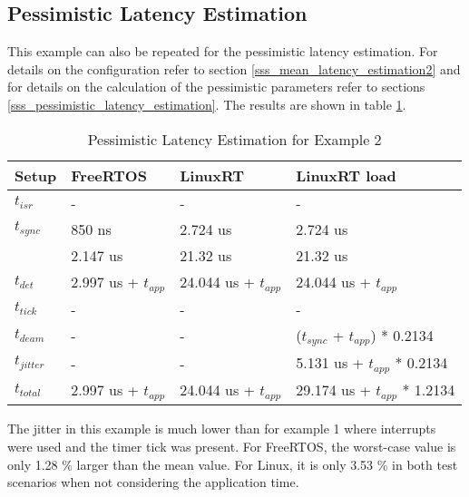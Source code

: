 \subsection{Pessimistic Latency Estimation}\label{sss_pessimistic_latency_estimation2}
This example can also be repeated for the pessimistic latency estimation.
For details on the configuration refer to section \ref{sss_mean_latency_estimation2} and for details on the calculation of the pessimistic parameters refer to sections \ref{sss_pessimistic_latency_estimation}.
The results are shown in table \ref{tab_example2_pessimistic}.
\begin{table}[htbp]
	\centering
		\begin{tabular}{|l|l|l|l|}
			\hline
				Setup					& FreeRTOS 								& LinuxRT 							& LinuxRT load  \\
				\hline 
			 	$t_{isr}$ 		& -				 								& -											& -							\\
			  $t_{sync}$		& 850 ns			  	  			& 2.724 us 				 			& 2.724 us			\\
			  							&	2.147 us								& 21.32 us							& 21.32 us			\\
			  \hline 
			  $t_{det}$			& 2.997 us + $t_{app}$		& 24.044 us + $t_{app}$	& 24.044 us	+ $t_{app}$		\\ 
			  \hline
			  \hline
			  $t_{tick}$		& -												& -					 					  & -													\\
			  $t_{deam}$		& -				  							& - 				 						& ($t_{sync}$ + $t_{app}$) * 0.2134 \\ 
				\hline 
			  $t_{jitter}$	& -				  							& -										  & 5.131 us	+ $t_{app}$ * 0.2134 \\ 
			  \hline
			  \hline 
			  $t_{total}$		& 2.997 us + $t_{app}$	 & 24.044 us + $t_{app}$  &	29.174 us + $t_{app}$ * 1.2134 	\\ 
			\hline
		\end{tabular}
	\caption{Pessimistic Latency Estimation for Example 2}
	\label{tab_example2_pessimistic}
\end{table}

The jitter in this example is much lower than for example 1 where interrupts were used and the timer tick was present.
For FreeRTOS, the worst-case value is only 1.28 \% larger than the mean value.
For Linux, it is only 3.53 \% in both test scenarios when not considering the application time. 

